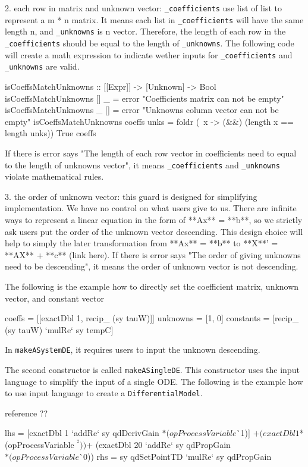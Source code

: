 2. each row in matrix and unknown vector: \verb|_coefficients| use list of list to represent a m * n matrix. It means each list in \verb|_coefficients| will have the same length n, and \verb|_unknowns| is n vector. Therefore, the length of each row in the \verb|_coefficients| should be equal to the length of \verb|_unknowns|. The following code will create a math expression to indicate wether inputs for \verb|_coefficients| and \verb|_unknowns| are valid.

\begin{haskell1}
isCoeffsMatchUnknowns :: [[Expr]] -> [Unknown] -> Bool
isCoeffsMatchUnknowns [] _ = error "Coefficients matrix can not be empty"
isCoeffsMatchUnknowns _ [] = error "Unknowns column vector can not be empty"
isCoeffsMatchUnknowns coeffs unks = foldr (\ x -> (&&) (length x == length unks)) True coeffs
\end{haskell1}

If there is error says "The length of each row vector in coefficients need to equal to the length of unknowns vector", it means \verb|_coefficients| and \verb|_unknowns| violate mathematical rules.

3. the order of unknown vector: this guard is designed for simplifying implementation. We have no control on what users give to us. There are infinite ways to represent a linear equation in the form of **Ax** = **b**, so we strictly ask users put the order of the unknown vector descending. This design choice will help to simply the later transformation from **Ax** = **b** to **X**' = **AX** + **c** (link here). If there is error says "The order of giving unknowns need to be descending", it means the order of unknown vector is not descending.

The following is the example how to directly set the coefficient matrix, unknown vector, and constant vector

\begin{haskell1}
coeffs = [[exactDbl 1, recip_ (sy tauW)]]
unknowns = [1, 0]
constants = [recip_ (sy tauW) `mulRe` sy tempC]
\end{haskell1}

In \verb|makeASystemDE|, it requires users to input the unknown descending.

The second constructor is called \verb|makeASingleDE|. This constructor uses the input language to simplify the input of a single ODE. The following is the example how to use input language to create a \verb|DifferentialModel|.

reference ??
\begin{haskell1}
lhs = [exactDbl 1 `addRe` sy qdDerivGain $* (opProcessVariable $^^ 1)]
 $+ (exactDbl 1 $* (opProcessVariable $^^ 2))
 $+ (exactDbl 20 `addRe` sy qdPropGain $* (opProcessVariable $^^ 0))
rhs = sy qdSetPointTD `mulRe` sy qdPropGain
\end{haskell1}

